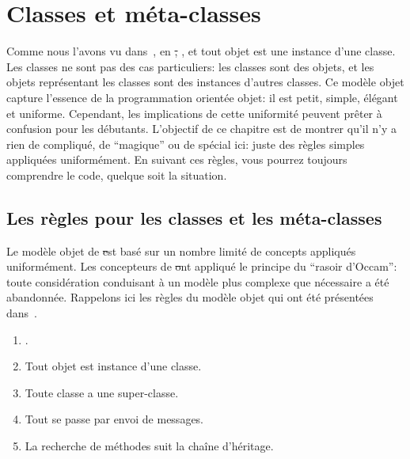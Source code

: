\documentclass[a4paper,10pt,twoside]{book}
\begin{document}
	\renewcommand{\nnbb}[2]{} %
	\sloppy
\fi
\chapter{Classes et méta-classes}


Comme nous l'avons vu dans~, en \st, \mantra, et tout objet est une instance d'une classe.
Les classes ne sont pas des cas particuliers:
les classes sont des objets, et les objets représentant les classes sont des instances d'autres classes.
Ce modèle objet capture l'essence de la programmation orientée objet: il est petit, simple, élégant et uniforme.
Cependant, les implications de cette uniformité peuvent prêter à confusion pour les débutants.
L'objectif de ce chapitre est de montrer qu'il n'y a rien de compliqué, de ``magique'' ou de spécial ici: juste des règles simples appliquées uniformément. 
En suivant ces règles, vous pourrez toujours comprendre le code, quelque soit la situation.

\section{Les règles pour les classes et les méta-classes}

Le modèle objet de \st est basé sur un nombre limité de concepts appliqués uniformément.
Les concepteurs de \st ont appliqué le principe du ``rasoir d'Occam'': toute considération conduisant à un modèle plus complexe que nécessaire a été abandonnée.
Rappelons ici les règles du modèle objet qui ont été présentées dans~.

\begin{enumerate}[label={\textbf{Règle \arabic{*}}.}, ref={la règle~\arabic{*}}, leftmargin=*, widest=10]
\item{} %
	\Mantra.

\item{} %
	Tout objet est instance d'une classe.

\item{} %
	Toute classe a une super-classe.

\item{} %
	Tout se passe par envoi de messages. 
\item{} %
	La recherche de méthodes suit la chaîne d'héritage.
\end{enumerate}
\end{document}
